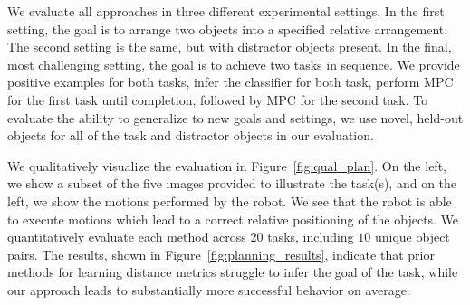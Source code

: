 We evaluate all approaches in three different experimental settings. In the first setting, the goal is to arrange two objects into a specified relative arrangement. The second setting is the same, but with distractor objects present. In the final, most challenging setting, the goal is to achieve two tasks in sequence. We provide positive examples for both tasks, infer the classifier for both task, perform MPC for the first task until completion, followed by MPC for the second task. To evaluate the ability to generalize to new goals and settings, we use novel, held-out objects for all of the task and distractor objects in our evaluation. 

We qualitatively visualize the evaluation in Figure~\ref{fig:qual_plan}. On the left, we show a subset of the five images provided to illustrate the task(s), and on the left, we show the motions performed by the robot. We see that the robot is able to execute motions which lead to a correct relative positioning of the objects.
We quantitatively evaluate each method across 20 tasks, including $10$ unique object pairs. The results, shown in Figure~\ref{fig:planning_results}, indicate that prior methods for learning distance metrics struggle to infer the goal of the task, while our approach leads to substantially more successful behavior on average. 

